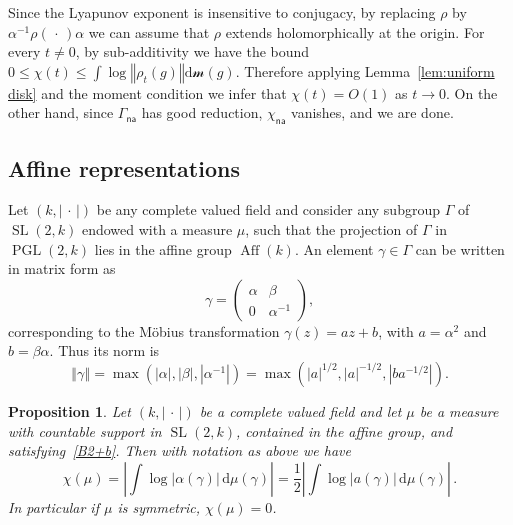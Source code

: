 \documentclass[11pt]{article}
\newtheorem{prop}[theo]{Proposition}
\theoremstyle{definition}
\numberwithin{equation}{section}
\numberwithin{figure}{section}
\numberwithin{table}{section}
\DeclareMathOperator{\SL}{SL}
\DeclareMathOperator{\PGL}{PGL}
\DeclareMathOperator{\Aff}{Aff}
\newcommand{\sm}{\mathcal{m}}
\newcommand{\norm}[1]{\left\Vert#1\right\Vert}
\newcommand{\abs}[1]{\left\vert#1\right\vert}
\newcommand{\lrpar}[1]{\left(#1\right)}
\newcommand{\na}{\mathsf{na}}
\newcommand{\SLk}{\SL(2,k)}
\newcommand{\PGLk}{\PGL(2, k)}
\newcommand{\inv}{^{-1}}
\newcommand*{\dd}{\mathrm{d}}
\newcommand*{\dmu}{\dd \mu}
\newcommand*{\dsm}{\dd \sm}
\begin{document}
Since the Lyapunov exponent is insensitive to conjugacy, by replacing $\rho$ by\linebreak $\alpha\inv\rho({\,\cdot\,})\alpha$ we can assume that $\rho$ extends holomorphically at the origin. For every $t\neq 0$, by sub-additivity we have the bound $0\leq \chi(t) \leq \int \log \norm{\rho_t(g)} \dsm(g)$. Therefore applying Lemma~\ref{lem:uniform disk} and the moment condition we infer that $\chi(t) = O(1)$ as $t\to 0$. On the other hand, since $\Gamma_\na$ has good reduction, $\chi_\na$ vanishes, and we are done.

\subsection{Affine representations}

Let $({k},\abs{{\,\cdot\,}})$ be any complete valued field and consider any subgroup $\Gamma$ of $\SLk$ endowed with a measure $\mu$, such that the projection of $\Gamma$ in $\PGLk$ lies in the affine group $\Aff(k)$. An element $\gamma\in \Gamma$ can be written in matrix form as
\begin{equation}\label{eq:matrix}
\gamma = \lrpar{
\begin{matrix} \alpha & \beta \\ 0 &\alpha\inv
\end{matrix}},
\end{equation}
corresponding to the M\"obius transformation $\gamma(z) = az+b$, with $a= \alpha^2$ and $b = \beta\alpha$. Thus its norm is
\begin{equation}\label{eq:norm affine}
\norm{\gamma} =
\max\lrpar{ \abs{\alpha}, \abs{\beta}, \abs{\alpha\inv} }= \max\lrpar{\abs{a}^{1/2}, \abs{a}^{ -1/2}, \abs{ba^{-1/2}} }.
\end{equation}

\begin{prop}\label{prop:formula affine}
Let $(k,\abs{{\,\cdot\,}})$ be a complete valued field and let $\mu$ be a measure with countable support in $\SLk$, contained in the affine group, and satisfying~\eqref{B2+b}. Then with notation as above we have
\begin{equation}\label{eq:formula affine}
\chi(\mu) =
\abs{\int \log |\alpha (\gamma)| \, \dmu(\gamma)} = \frac12 \abs{\int \log |a(\gamma)|\, \dmu(\gamma)}\,.
\end{equation}
In particular if $\mu$ is symmetric, $\chi(\mu) = 0$.
\end{prop}
\end{document}
